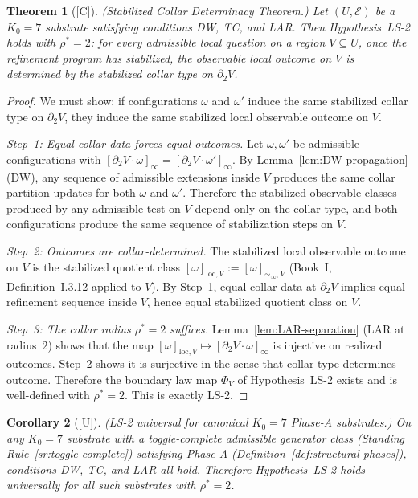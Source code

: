 \documentclass[12pt,oneside]{amsbook}
\theoremstyle{plain}
\newtheorem{theorem}{Theorem}[section]
\newtheorem{corollary}[theorem]{Corollary}
\theoremstyle{definition}
\theoremstyle{remark}
\newcommand{\status}[1]{\textup{[#1]}}
\begin{document}
\begin{theorem}[\status{C}]\label{thm:ls2-from-conditions}
\textup{(Stabilized Collar Determinacy Theorem.)}  Let $(U, \mathcal{E})$
be a $K_0 = 7$ substrate satisfying conditions DW, TC, and LAR.  Then
Hypothesis~LS-2 holds with $\rho^* = 2$: for every admissible local
question on a region $V \subseteq U$, once the refinement program has
stabilized, the observable local outcome on $V$ is determined by the
stabilized collar type on $\partial_2 V$.
\end{theorem}

\begin{proof}
We must show: if configurations $\omega$ and $\omega'$ induce the same
stabilized collar type on $\partial_2 V$, they induce the same
stabilized local observable outcome on $V$.

\emph{Step~1: Equal collar data forces equal outcomes.}  Let $\omega,
\omega'$ be admissible configurations with $[\partial_2 V \cdot
\omega]_\infty = [\partial_2 V \cdot \omega']_\infty$.  By
Lemma~\ref{lem:DW-propagation} (DW), any sequence of admissible
extensions inside $V$ produces the same collar partition updates for
both $\omega$ and $\omega'$.  Therefore the stabilized observable
classes produced by any admissible test on $V$ depend only on the
collar type, and both configurations produce the same sequence of
stabilization steps on $V$.

\emph{Step~2: Outcomes are collar-determined.}  The stabilized local
observable outcome on $V$ is the stabilized quotient class
$[\omega]_{\mathrm{loc},V} := [\omega]_{\sim_\infty, V}$ (Book~I,
Definition~I.3.12 applied to $V$).  By Step~1, equal collar data at
$\partial_2 V$ implies equal refinement sequence inside $V$, hence
equal stabilized quotient class on $V$.

\emph{Step~3: The collar radius $\rho^* = 2$ suffices.}
Lemma~\ref{lem:LAR-separation} (LAR at radius~$2$) shows that the map
$[\omega]_{\mathrm{loc},V} \mapsto [\partial_2 V \cdot \omega]_\infty$
is injective on realized outcomes.  Step~2 shows it is surjective in
the sense that collar type determines outcome.  Therefore the boundary
law map $\Phi_V$ of Hypothesis~LS-2 exists and is well-defined with
$\rho^* = 2$.  This is exactly LS-2.
\end{proof}

\begin{corollary}[\status{U}]\label{cor:ls2-universal-K07}
\textup{(LS-2 universal for canonical $K_0 = 7$ Phase-A substrates.)}
On any $K_0 = 7$ substrate with a toggle-complete admissible generator
class (Standing Rule~\ref{sr:toggle-complete}) satisfying Phase-A
(Definition~\ref{def:structural-phases}), conditions DW, TC, and LAR
all hold.  Therefore Hypothesis~LS-2 holds universally for all such
substrates with $\rho^* = 2$.
\end{corollary}
\end{document}
